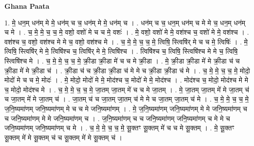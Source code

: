 \documentclass[17pt]{extarticle}
\begin{document}
\textbf{Ghana Paata } \newline

1. मे॒ धन॒म् धन॑म् मे मे॒ धन॑म् च च॒ धन॑म् मे मे॒ धन॑म् च । . धन॑म् च च॒ धन॒म् धन॑म् च मे मे च॒ धन॒म् धन॑म् च मे । . च॒ मे॒ मे॒ च॒ च॒ मे॒ वशो॒ वशो॑ मे च च मे॒ वशः॑ । . मे॒ वशो॒ वशो॑ मे मे॒ वश॑श्च च॒ वशो॑ मे मे॒ वश॑श्च । . वश॑श्च च॒ वशो॒ वश॑श्च मे मे च॒ वशो॒ वश॑श्च मे । . च॒ मे॒ मे॒ च॒ च॒ मे॒ त्विषि॒ स्त्विषि॑र् मे च च मे॒ त्विषिः॑ । . मे॒ त्विषि॒ स्त्विषि॑र् मे मे॒ त्विषि॑श्च च॒ त्विषि॑र् मे मे॒ त्विषि॑श्च । . त्विषि॑श्च च॒ त्विषि॒ स्त्विषि॑श्च मे मे च॒ त्विषि॒ स्त्विषि॑श्च मे । . च॒ मे॒ मे॒ च॒ च॒ मे॒ क्री॒डा क्री॒डा मे॑ च च मे क्री॒डा । . मे॒ क्री॒डा क्री॒डा मे॑ मे क्री॒डा च॑ च क्री॒डा मे॑ मे क्री॒डा च॑ । . क्री॒डा च॑ च क्री॒डा क्री॒डा च॑ मे मे च क्री॒डा क्री॒डा च॑ मे । . च॒ मे॒ मे॒ च॒ च॒ मे॒ मोदो॒ मोदो॑ मे च च मे॒ मोदः॑ । . मे॒ मोदो॒ मोदो॑ मे मे॒ मोद॑श्च च॒ मोदो॑ मे मे॒ मोद॑श्च । . मोद॑श्च च॒ मोदो॒ मोद॑श्च मे मे च॒ मोदो॒ मोद॑श्च मे । . च॒ मे॒ मे॒ च॒ च॒ मे॒ जा॒तम् जा॒तम् मे॑ च च मे जा॒तम् । . मे॒ जा॒तम् जा॒तम् मे॑ मे जा॒तम् च॑ च जा॒तम् मे॑ मे जा॒तम् च॑ । . जा॒तम् च॑ च जा॒तम् जा॒तम् च॑ मे मे च जा॒तम् जा॒तम् च॑ मे । . च॒ मे॒ मे॒ च॒ च॒ मे॒ ज॒नि॒ष्यमा॑णम् जनि॒ष्यमा॑णम् मे च च मे जनि॒ष्यमा॑णम् । . मे॒ ज॒नि॒ष्यमा॑णम् जनि॒ष्यमा॑णम् मे मे जनि॒ष्यमा॑णम् च च जनि॒ष्यमा॑णम् मे मे जनि॒ष्यमा॑णम् च । . ज॒नि॒ष्यमा॑णम् च च जनि॒ष्यमा॑णम् जनि॒ष्यमा॑णम् च मे मे च जनि॒ष्यमा॑णम् जनि॒ष्यमा॑णम् च मे । . च॒ मे॒ मे॒ च॒ च॒ मे॒ सू॒क्तꣳ सू॒क्तम् मे॑ च च मे सू॒क्तम् । . मे॒ सू॒क्तꣳ सू॒क्तम् मे॑ मे सू॒क्तम् च॑ च सू॒क्तम् मे॑ मे सू॒क्तम् च॑ । \newline
\end{document}
